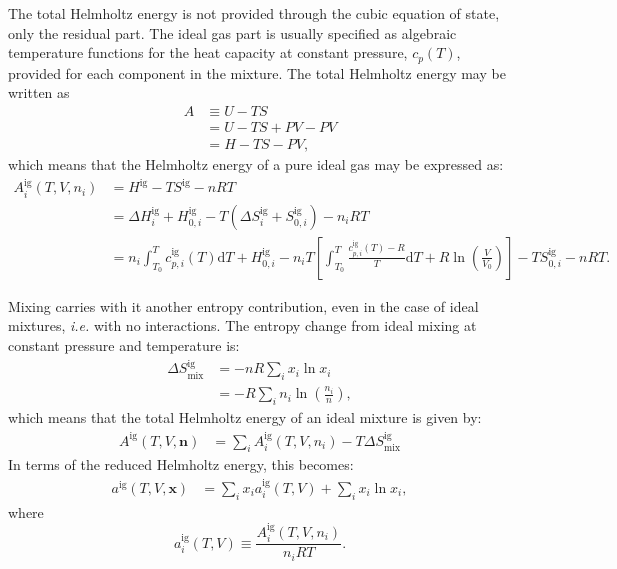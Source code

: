 \documentclass[internal,english]{sintefmemo2012}
\newcommand*{\vektor}[1]{\boldsymbol{#1}}%
\newcommand{\dd}[1]{\mathrm{d}{#1}}
\begin{document}
The total Helmholtz energy is not provided through the cubic equation of state, only the residual part.
The ideal gas part is usually specified as 
algebraic temperature functions for the heat capacity at constant pressure, $c_p(T)$, provided
for each component in the mixture. The total Helmholtz energy may be written as 
\begin{align}
  A &\equiv U - TS \nonumber\\
  &=U-TS+PV-PV \nonumber\\
  &= H - TS - PV,
  \label{}
\end{align}
which means that the Helmholtz energy of a pure ideal gas may be expressed as:
\begin{align}
  A^\text{ig}_i(T,V,n_i) &= H^\text{ig} - TS^\text{ig} - nRT
  \nonumber\\
  &= \Delta H_i^\text{ig} + H_{0,i}^\text{ig} 
  - T\left(  \Delta S_i^\text{ig} + S_{0,i}^\text{ig}  \right)  - n_i RT
  \nonumber\\
  &=  n_i \int_{T_0}^T c_{p,i}^\text{ig}(T) \dd{T} + H_{0,i}^\text{ig}
  -  n_i T \left[ \int_{T_0}^T \frac{c_{p,i}^\text{ig}(T) - R}{T} \dd{T} 
    + R \ln \left( \frac{V}{V_0} \right) \right]
     - T S_{0,i}^\text{ig} - nRT.
  \label{}
\end{align}

Mixing carries with it another entropy contribution, even in the case of ideal mixtures, \textit{i.e.} with no interactions. The entropy change 
from ideal mixing at constant pressure and temperature is:
\begin{align}
  \Delta S^\text{ig}_\text{mix} &= -nR \sum_i x_i \ln x_i 
  \nonumber\\
  &= -R \sum_i n_i \ln \left( \frac{n_i}{n} \right),
  \label{}
\end{align}
which means that the total Helmholtz energy of an ideal mixture is given by:
\begin{align}
  A^\text{ig}(T,V,\vektor{n}) &=  \sum_i A_i^\text{ig}(T,V,n_i) - T \Delta S^\text{ig}_\text{mix}
  \label{}
\end{align}
In terms of the reduced Helmholtz energy, this becomes:
\begin{align}
  a^\text{ig}(T,V,\vektor{x}) &=  \sum_i x_i a_i^\text{ig}(T,V) + \sum_i x_i \ln x_i, 
  \label{}
\end{align}
where 
\begin{equation}
  a_i^\text{ig}(T,V) \equiv \frac{A^\text{ig}_i(T,V,n_i)}{n_i RT}.
  \label{}
\end{equation}
\end{document}
